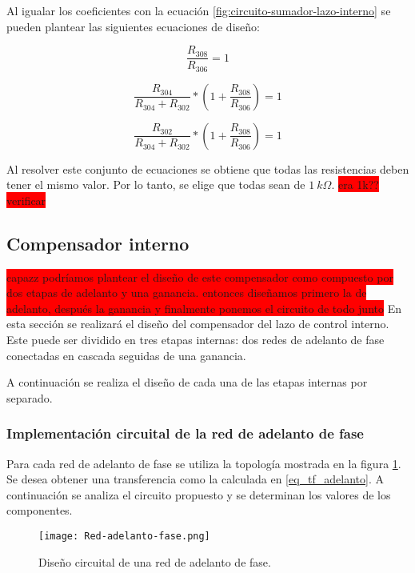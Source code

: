 Al igualar los coeficientes con la ecuación \ref{fig:circuito-sumador-lazo-interno} se pueden plantear las siguientes ecuaciones de diseño:

\begin{equation}
	\frac{R_{308}}{R_{306}}=1
\end{equation}

\begin{equation}
	\frac{R_{304}}{R_{304}+R_{302}}*(1+\frac{R_{308}}{R_{306}})=1
\end{equation}

\begin{equation}
	\frac{R_{302}}{R_{304}+R_{302}}*(1+\frac{R_{308}}{R_{306}})=1
\end{equation}

Al resolver este conjunto de ecuaciones se obtiene que todas las resistencias deben tener el mismo valor. Por lo tanto, se elige que todas sean de $1\:k\Omega$. \colorbox{red}{era 1k?? verificar}

\subsection{Compensador interno}
\colorbox{red}{capazz podríamos plantear el diseño de este compensador como compuesto por dos etapas de  adelanto y una ganancia. entonces diseñamos primero la de adelanto, después la ganancia y finalmente ponemos el circuito de todo junto}
En esta sección se realizará el diseño del compensador del lazo de control interno. Este puede ser dividido en tres etapas internas: dos redes de adelanto de fase conectadas en cascada seguidas de una ganancia.

A continuación se realiza el diseño de cada una de las etapas internas por separado.

\subsubsection{Implementación circuital de la red de adelanto de fase}

Para cada red de adelanto de fase se utiliza la topología mostrada en la figura \ref{fig:red-adelanto-fase}. Se desea obtener una transferencia como la calculada en \ref{eq_tf_adelanto}. A continuación se analiza el circuito propuesto y se determinan los valores de los componentes. 

\begin{figure}[H]
	\centering
	\texttt{[image: Red-adelanto-fase.png]}
	\caption{Diseño circuital de una red de adelanto de fase.}
	\label{fig:red-adelanto-fase}
\end{figure}

